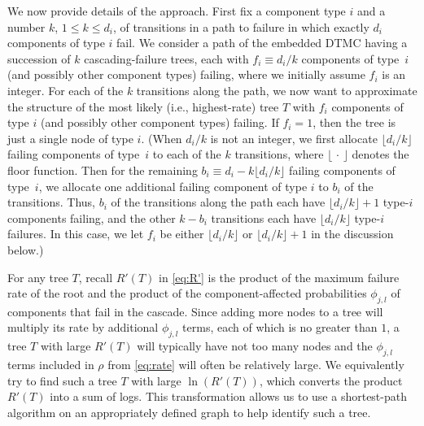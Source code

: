 \documentclass[12pt]{article}
\newcommand{\changed}[1]{#1}
\newcommand{\changed}[1]{\textcolor{red}{#1}}
\begin{document}
\changed{We now provide details
of the approach.
First fix a component type $i$
and a number $k$,
$1 \leq k \leq d_{i}$, of transitions
in a path to failure in which exactly
$d_{i}$ components of type $i$ fail.
We consider a path of the embedded
DTMC having
a succession of $k$ cascading-failure
trees, each with $f_{i} \equiv d_{i}/k$
components of type~$i$ (and possibly other component
types) failing, where we initially assume
$f_i$ is an integer.
For each of the $k$ transitions along the path,
we now want to approximate the
structure of the most likely
(i.e., highest-rate) tree $T$
with $f_{i}$ components of type $i$
(and possibly other component types) failing.
If $f_i = 1$, then the tree is just
a single node of type $i$.
(When $d_{i}/k$ is not an integer,
we first allocate $\lfloor d_{i}/k \rfloor$
failing components of type~$i$ to each
of the $k$ transitions,
where $\lfloor \, \cdot \, \rfloor$
denotes the floor function.
Then for the remaining $b_{i} \equiv
d_{i} - k \lfloor d_{i}/k \rfloor$ failing
components
of type~$i$, we allocate one
additional failing component of type $i$ to
$b_{i}$ of the transitions.
Thus, $b_i$ of the transitions
along the path each have
$\lfloor d_{i}/k \rfloor + 1$
type-$i$ components failing,
and the other $k - b_i$ transitions
each have $\lfloor d_{i}/k \rfloor$
type-$i$ failures.
In this case, we let $f_{i}$ be
either $\lfloor d_{i}/k \rfloor$
or $\lfloor d_{i}/k \rfloor + 1$
in the discussion below.)}

\changed{For any tree $T$,
recall $R'(T)$ in \eqref{eq:R'}
is the product of the
maximum failure rate of the root and the
product of the component-affected
probabilities $\phi_{j,l}$ of
components that fail in
the cascade.
Since adding more nodes to
a tree will multiply its rate
by additional $\phi_{j,l}$ terms,
each of which is no greater than $1$,
a tree $T$
with large $R'(T)$
will
typically have not too many nodes
and the $\phi_{j,l}$ terms}
included
in $\rho$ from \eqref{eq:rate} will
often be relatively large.
We equivalently try to find
such a tree $T$ with large $\ln(R'(T))$,
which converts the product $R'(T)$
into a sum of logs.
\changed{This transformation allows us to
use}
a shortest-path algorithm on
an appropriately defined graph
to help identify
such a tree.
\end{document}
